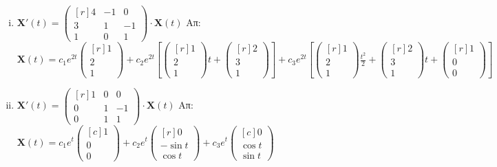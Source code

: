 \begin{enumerate}
\begin{enumerate}[i)]
      \item $ \mathbf{X}'(t) = 
        \begin{pmatrix*}[r]
          4 & -1 & 0 \\
          3 & 1 & -1 \\
          1 & 0 & 1
        \end{pmatrix*} \cdot 
        \mathbf{X}(t)$
        \hfill Απ: {\scriptsize $ \mathbf{X}(t)= c_{1} e^{2t}
          \begin{pmatrix*}[r] 1 \\ 2 \\ 1 \end{pmatrix*} + c_{2}e^{2t} \left[ 
            \begin{pmatrix*}[r] 1 \\ 2 \\ 1 \end{pmatrix*}t + 
            \begin{pmatrix*}[r] 2 \\ 3 \\ 1 \end{pmatrix*} \right] + c_{3}e^{2t} \left[
            \begin{pmatrix*}[r] 1 \\ 2 \\ 1 \end{pmatrix*} \frac{t^{2}}{2} +  
            \begin{pmatrix*}[r] 2 \\ 3 \\ 1 \end{pmatrix*} t + 
        \begin{pmatrix*}[r] 1 \\ 0 \\ 0 \end{pmatrix*}\right]  $} 

      \item $ \mathbf{X}'(t) = 
        \begin{pmatrix*}[r]
          1 & 0 & 0 \\
          0 & 1 & -1 \\
          0 & 1 & 1
        \end{pmatrix*} \cdot 
        \mathbf{X}(t) $
        \hfill Απ: {\scriptsize $ \mathbf{X}(t) = c_{1}e^{t} 
          \begin{pmatrix*}[c] 1 \\ 0 \\ 0 \end{pmatrix*} + c_{2}e^{t} 
          \begin{pmatrix*}[r] 0 \\ - \sin{t} \\ \cos{t}  \end{pmatrix*} + c_{3}e^{t} 
        \begin{pmatrix*}[c] 0 \\ \cos{t} \\ \sin{t}   \end{pmatrix*}$} 


\end{enumerate}
\end{enumerate}
